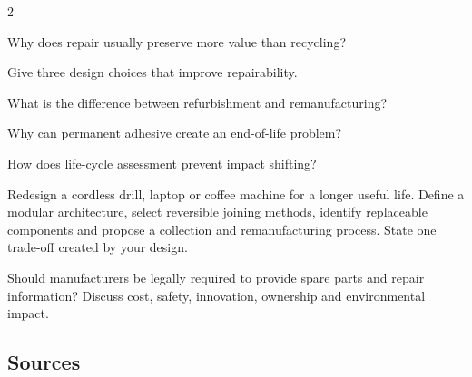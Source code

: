 \begin{multicols}{2}
\begin{questions}
\item Why does repair usually preserve more value than recycling?
\item Give three design choices that improve repairability.
\item What is the difference between refurbishment and remanufacturing?
\item Why can permanent adhesive create an end-of-life problem?
\item How does life-cycle assessment prevent impact shifting?
\end{questions}

\begin{engineeringchallenge}
Redesign a cordless drill, laptop or coffee machine for a longer useful life. Define a modular
architecture, select reversible joining methods, identify replaceable components and propose a
collection and remanufacturing process. State one trade-off created by your design.
\end{engineeringchallenge}

\begin{speaking}
Should manufacturers be legally required to provide spare parts and repair information? Discuss cost,
safety, innovation, ownership and environmental impact.
\end{speaking}
\end{multicols}

\subsection*{Sources}
